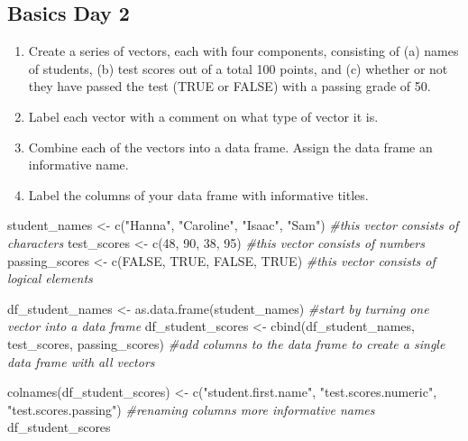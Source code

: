 \documentclass[
]{article}
\newenvironment{Shaded}{\begin{snugshade}}{\end{snugshade}}
\newcommand{\CommentTok}[1]{\textcolor[rgb]{0.56,0.35,0.01}{\textit{#1}}}
\newcommand{\ConstantTok}[1]{\textcolor[rgb]{0.00,0.00,0.00}{#1}}
\newcommand{\DecValTok}[1]{\textcolor[rgb]{0.00,0.00,0.81}{#1}}
\newcommand{\FunctionTok}[1]{\textcolor[rgb]{0.00,0.00,0.00}{#1}}
\newcommand{\NormalTok}[1]{#1}
\newcommand{\OtherTok}[1]{\textcolor[rgb]{0.56,0.35,0.01}{#1}}
\newcommand{\StringTok}[1]{\textcolor[rgb]{0.31,0.60,0.02}{#1}}
\begin{document}
\hypertarget{basics-day-2}{%
\subsection{Basics Day 2}\label{basics-day-2}}

\begin{enumerate}
\def\labelenumi{\arabic{enumi}.}
\setcounter{enumi}{4}
\item
  Create a series of vectors, each with four components, consisting of
  (a) names of students, (b) test scores out of a total 100 points, and
  (c) whether or not they have passed the test (TRUE or FALSE) with a
  passing grade of 50.
\item
  Label each vector with a comment on what type of vector it is.
\item
  Combine each of the vectors into a data frame. Assign the data frame
  an informative name.
\item
  Label the columns of your data frame with informative titles.
\end{enumerate}

\begin{Shaded}
\begin{Highlighting}[]
\NormalTok{student\_names }\OtherTok{\textless{}{-}} \FunctionTok{c}\NormalTok{(}\StringTok{"Hanna"}\NormalTok{, }\StringTok{"Caroline"}\NormalTok{, }\StringTok{"Isaac"}\NormalTok{, }\StringTok{"Sam"}\NormalTok{) }
\CommentTok{\#this vector consists of characters}
\NormalTok{test\_scores }\OtherTok{\textless{}{-}} \FunctionTok{c}\NormalTok{(}\DecValTok{48}\NormalTok{, }\DecValTok{90}\NormalTok{, }\DecValTok{38}\NormalTok{, }\DecValTok{95}\NormalTok{) }
\CommentTok{\#this vector consists of numbers}
\NormalTok{passing\_scores }\OtherTok{\textless{}{-}} \FunctionTok{c}\NormalTok{(}\ConstantTok{FALSE}\NormalTok{, }\ConstantTok{TRUE}\NormalTok{, }\ConstantTok{FALSE}\NormalTok{, }\ConstantTok{TRUE}\NormalTok{) }
\CommentTok{\#this vector consists of logical elements}

\NormalTok{df\_student\_names }\OtherTok{\textless{}{-}} \FunctionTok{as.data.frame}\NormalTok{(student\_names) }
\CommentTok{\#start by turning one vector into a data frame}
\NormalTok{df\_student\_scores }\OtherTok{\textless{}{-}} \FunctionTok{cbind}\NormalTok{(df\_student\_names, test\_scores, passing\_scores) }
\CommentTok{\#add columns to the data frame to create a single data frame with all vectors}

\FunctionTok{colnames}\NormalTok{(df\_student\_scores) }\OtherTok{\textless{}{-}} \FunctionTok{c}\NormalTok{(}\StringTok{"student.first.name"}\NormalTok{, }\StringTok{"test.scores.numeric"}\NormalTok{, }\StringTok{"test.scores.passing"}\NormalTok{) }
\CommentTok{\#renaming columns more informative names}
\NormalTok{df\_student\_scores}
\end{Highlighting}
\end{Shaded}
\end{document}
